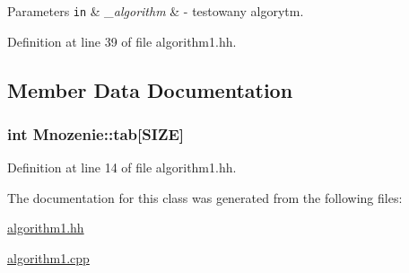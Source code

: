 \begin{DoxyParams}[1]{Parameters}
\mbox{\tt in}  & {\em \-\_\-algorithm} & -\/ testowany algorytm. \\
\hline
\end{DoxyParams}


Definition at line 39 of file algorithm1.\-hh.



\subsection{Member Data Documentation}
\hypertarget{class_mnozenie_a6dc67671f84a557d97c322b8af528359}{
\subsubsection[{tab}]{\setlength{\rightskip}{0pt plus 5cm}int Mnozenie\-::tab\mbox{[}{\bf S\-I\-Z\-E}\mbox{]}\hspace{0.3cm}{\ttfamily [private]}}}\label{class_mnozenie_a6dc67671f84a557d97c322b8af528359}


Definition at line 14 of file algorithm1.\-hh.



The documentation for this class was generated from the following files\-:\begin{DoxyCompactItemize}
\item 
\hyperlink{algorithm1_8hh}{algorithm1.\-hh}\item 
\hyperlink{algorithm1_8cpp}{algorithm1.\-cpp}\end{DoxyCompactItemize}
